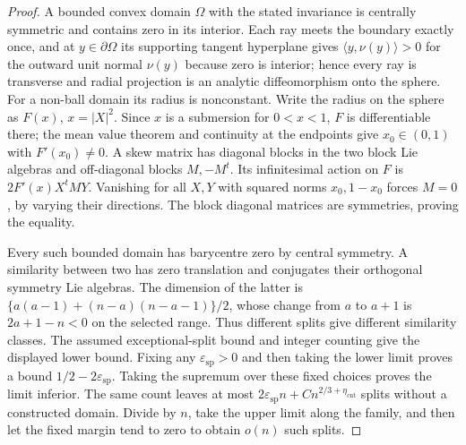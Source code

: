 \begin{proof}
A bounded convex domain $\Omega$ with the stated invariance is centrally
symmetric and contains zero in its interior. Each ray meets the boundary
exactly once, and at $y\in\partial\Omega$ its supporting tangent
hyperplane gives $\langle y,\nu(y)\rangle>0$ for the outward unit
normal $\nu(y)$ because zero is interior; hence every ray is transverse
and radial projection is an analytic diffeomorphism onto the sphere.
For a non-ball domain its radius is nonconstant.
Write the radius on the sphere as $F(x)$, $x=|X|^2$.
Since $x$ is a submersion for $0<x<1$, $F$ is differentiable there;
the mean value theorem and continuity at the endpoints give
$x_0\in(0,1)$ with $F'(x_0)\ne0$.
A skew matrix has diagonal blocks in the two block Lie algebras and
off-diagonal blocks $M,-M^t$. Its infinitesimal action on $F$ is
$2F'(x)X^tMY$. Vanishing for all $X,Y$ with squared norms
$x_0,1-x_0$ forces $M=0$, by varying their directions. The block
diagonal matrices are symmetries, proving the equality.

Every such bounded domain has barycentre zero by central symmetry. A similarity between
two has zero translation and conjugates their orthogonal symmetry
Lie algebras. The dimension of the latter is
$\{a(a-1)+(n-a)(n-a-1)\}/2$, whose change from $a$ to $a+1$ is
$2a+1-n<0$ on the selected range. Thus different splits give different
similarity classes. The assumed exceptional-split bound and integer
counting give the displayed lower bound. Fixing any $\varepsilon_{\mathrm{sp}}>0$
and then taking the lower limit proves a bound $1/2-2\varepsilon_{\mathrm{sp}}$.
Taking the supremum over these fixed choices proves the limit inferior.
The same count leaves at most
$2\varepsilon_{\mathrm{sp}}n+Cn^{2/3+\eta_{\mathrm{cnt}}}$ splits
without a constructed domain. Divide by $n$, take the upper limit
along the family, and then let the fixed margin tend to zero to
obtain $o(n)$ such splits.
\end{proof}

